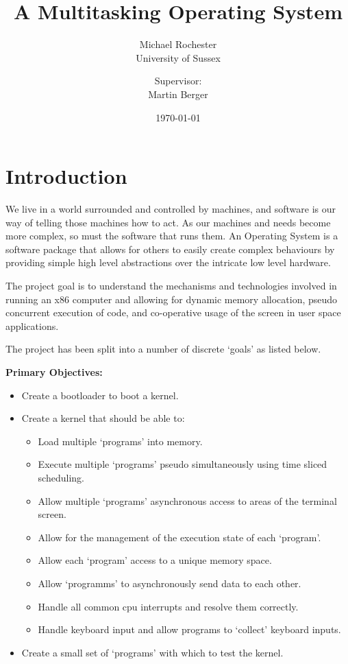 \documentclass[a4paper]{report}
\title{A Multitasking Operating System}
\date{\today}
\author{Michael Rochester\\ University of Sussex
        \and Supervisor:\\ Martin Berger}
\begin{document}
\titlespacing*{\chapter}{0pt}{-50pt}{20pt}
\titleformat{\chapter}[display]{\normalfont\huge\bfseries}{\chaptertitlename\ \thechapter}{20pt}{\Huge}


\maketitle

\tableofcontents
\listoffigures

\chapter*{Introduction}
We live in a world surrounded and controlled by machines, and software is our way of telling those machines how to act. As our machines and needs become more complex, so must the software that runs them. An Operating System is a software package that allows for others to easily create complex behaviours by providing simple high level abstractions over the intricate low level hardware.

The project goal is to understand the mechanisms and technologies involved in running an x86 computer and allowing for dynamic memory allocation, pseudo concurrent execution of code, and co-operative usage of the screen in user space applications.

The project has been split into a number of discrete `goals' as listed below.


\textbf {Primary Objectives:}

\begin{itemize}
\item Create a bootloader to boot a kernel.
\item Create a kernel that should be able to:
\begin{itemize}
\item Load multiple `programs' into memory.
\item Execute multiple `programs' pseudo simultaneously using time sliced scheduling.
\item Allow multiple `programs' asynchronous access to areas of the terminal screen.
\item Allow for the management of the execution state of each `program'.
\item Allow each `program' access to a unique memory space.
\item Allow `programms' to asynchronously send data to each other.
\item Handle all common cpu interrupts and resolve them correctly.
\item Handle keyboard input and allow programs to `collect' keyboard inputs.
\end{itemize}
\item Create a small set of `programs' with which to test the kernel.
\end{itemize}
\end{document}
